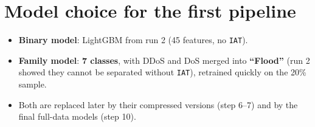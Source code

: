 \documentclass[11pt]{article}
\begin{document}
\section{Model choice for the first pipeline}
\begin{itemize}
\item \textbf{Binary model}: LightGBM from run 2 (45 features, no \texttt{IAT}).
\item \textbf{Family model}: \textbf{7 classes}, with DDoS and DoS merged into \textbf{``Flood''} (run 2 showed they cannot be separated without \texttt{IAT}),
retrained quickly on the 20\% sample.
\item Both are replaced later by their compressed versions (step 6--7) and by the final full-data models (step 10).
\end{itemize}
\end{document}
